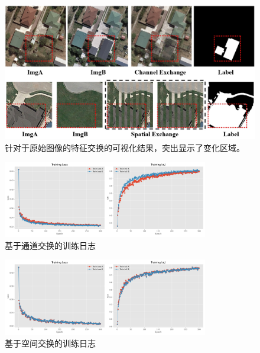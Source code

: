 \begin{figure}[!htbp]
    \centering
    \includegraphics[width=\textwidth]{paper_figures/变化检测任务基础范式设计/seed_exchange_vis.png} %
    \caption{针对于原始图像的特征交换的可视化结果，突出显示了变化区域。}
    \label{fig:seed_exchange_vis}
\end{figure}

\begin{figure}[!htbp]
  \centering
    \includegraphics[width=0.8\textwidth]{paper_figures/变化检测任务基础范式设计/chanel_training_log.png} %
    \caption{基于通道交换的训练日志}
    \label{fig:chanel_training}
\end{figure}
  
\begin{figure}[!htbp]
    \centering
    \includegraphics[width=0.8\textwidth]{paper_figures/变化检测任务基础范式设计/spatial_training_log.png} %
    \caption{基于空间交换的训练日志}
    \label{fig:spatial_training}
\end{figure}

